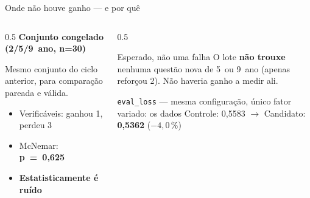 \documentclass[aspectratio=169,11pt]{beamer}
\newcommand{\badmark}{{\color{badred}\faTimesCircle}}
\begin{document}
\begin{frame}{Onde não houve ganho — e por quê}
  \begin{columns}[T]
    \begin{column}{0.5\textwidth}
      \textbf{Conjunto congelado (2\textordmasculine/5\textordmasculine/9\textordmasculine\ ano, n=30)}

      Mesmo conjunto do ciclo anterior, para comparação pareada e válida.
      \vspace{0.2cm}
      \begin{itemize}
        \item Verificáveis: ganhou 1, perdeu 3
        \item McNemar: \textbf{p~=~0,625} \badmark
        \item \textbf{Estatisticamente é ruído}
      \end{itemize}
    \end{column}
    \begin{column}{0.5\textwidth}
      \begin{block}{Esperado, não uma falha}
        O lote \textbf{não trouxe} nenhuma questão nova de 5\textordmasculine\ ou 9\textordmasculine\ ano
        (apenas reforçou 2\textordmasculine). Não haveria ganho a medir ali.
      \end{block}
      \vspace{0.15cm}
      \begin{exampleblock}{\texttt{eval\_loss} — mesma configuração, único fator variado: os dados}
        Controle: 0,5583 $\longrightarrow$ Candidato: \textbf{0,5362} ($-4,0\,\%$)
      \end{exampleblock}
    \end{column}
  \end{columns}
\end{frame}
\end{document}
